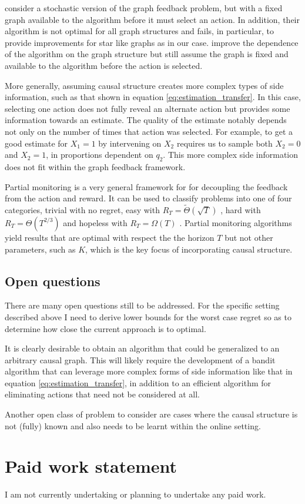 \documentclass[11pt,a4paper]{article}
\newcommand{\bigtheta}[1]{\Theta\left( #1 \right)}
\newcommand{\bigthetatilde}[1]{\tilde{\Theta}\left( #1 \right)}
\newcommand{\bigomega}[1]{\Omega\left( #1 \right)}
\begin{document}
\cite{Lelarge2012} consider a stochastic version of the graph feedback problem, but with a fixed graph available to the algorithm before it must select an action. In addition, their algorithm is not optimal for all graph structures and fails, in particular, to provide improvements for star like graphs as in our case. \cite{Buccapatnam2014} improve the dependence of the algorithm on the graph structure but still assume the graph is fixed and available to the algorithm before the action is selected. 

More generally, assuming causal structure creates more complex types of side information, such as that shown in equation \ref{eq:estimation_transfer}. In this case, selecting one action does not fully reveal an alternate action but provides some information towards an estimate. The quality of the estimate notably depends not only on the number of times that action was selected. For example, to get a good estimate for $X_1 = 1$ by intervening on $X_2$ requires us to sample both $X_2=0$ and $X_2=1$, in proportions dependent on $q_2$. This more complex side information does not fit within the graph feedback framework.

Partial monitoring is a very general framework for for decoupling the feedback from the action and reward. It can be used to classify problems into one of four categories, trivial with no regret, easy with $R_T = \bigthetatilde{\sqrt{T}}$ , hard with $R_T = \bigtheta{T^{2/3}}$ and hopeless with $R_T = \bigomega{T}$ \cite{Bartok2014}. Partial monitoring algorithms yield results that are optimal with respect the the horizon $T$ but not other parameters, such as $K$, which is the key focus of incorporating causal structure. 



\subsection{Open questions}

There are many open questions still to be addressed. For the specific setting described above I need to derive lower bounds for the worst case regret so as to determine how close the current approach is to optimal. 

It is clearly desirable to obtain an algorithm that could be generalized to an arbitrary causal graph. This will likely require the development of a bandit algorithm that can leverage more complex forms of side information like that in equation \ref{eq:estimation_transfer}, in addition to an efficient algorithm for eliminating actions that need not be considered at all.

Another open class of problem to consider are cases where the causal structure is not (fully) known and also needs to be learnt within the online setting. 

\section{Paid work statement}
I am not currently undertaking or planning to undertake any paid work.


\end{document}
